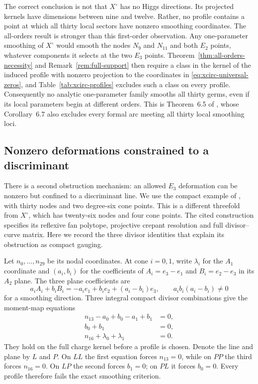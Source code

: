 The correct conclusion is not that $X^{\circ}$ has no Higgs directions. Its
projected kernels have dimensions between nine and twelve. Rather, no profile
contains a point at which all thirty local sectors have nonzero smoothing
coordinates. The all-orders result is stronger than this first-order
observation. Any one-parameter smoothing of $X^{\circ}$ would smooth the
nodes $N_9$ and $N_{11}$ and both $E_2$ points, whatever components it
selects at the two $E_3$ points. Theorem~\ref{thm:all-orders-necessity} and
Remark~\ref{rem:full-support} then require a class in the kernel of the
induced profile with nonzero projection to the coordinates in
\eqref{eq:xcirc-universal-zeros}, and Table~\ref{tab:xcirc-profiles}
excludes such a class on every profile. Consequently no analytic
one-parameter family smooths all thirty germs, even if its local parameters
begin at different orders. This is Theorem~6.5 of
\cite{Wuebben:2026obstruction}, whose Corollary~6.7 also excludes every
formal arc meeting all thirty local smoothing loci.

\subsection{Nonzero deformations constrained to a discriminant}
\label{subsec:discriminant-obstruction}

There is a second obstruction mechanism: an allowed $E_3$ deformation
can be nonzero but confined to a discriminant line. We use the compact
example of \cite[Theorems~5.1 and~5.3]{Wuebben:2026smoothing}, with thirty
nodes and two degree-six cone points. This is a different threefold from
$X^{\circ}$, which has twenty-six nodes and four cone points. The cited
construction specifies its reflexive fan polytope, projective crepant
resolution and full divisor--curve matrix. Here we record the three
divisor identities that explain its obstruction as compact gauging.

Let $n_0,\ldots,n_{29}$ be its nodal coordinates. At cone $i=0,1$,
write $\lambda_i$ for the $A_1$ coordinate and $(a_i,b_i)$ for the
coefficients of $A_i=e_3-e_1$ and $B_i=e_2-e_3$ in its $A_2$ plane.
The three plane coefficients are
\begin{equation}
 a_iA_i+b_iB_i=-a_i e_1+b_i e_2+(a_i-b_i)e_3,
 \qquad a_ib_i(a_i-b_i)\ne0
 \label{eq:discriminant-example-plane}
\end{equation}
for a smoothing direction. Three integral compact divisor combinations
give the moment-map equations
\begin{equation}
 \begin{aligned}
 n_{13}-a_0+b_0-a_1+b_1&=0,\\
 b_0+b_1&=0,\\
 n_{16}+\lambda_0+\lambda_1&=0.
 \end{aligned}
 \label{eq:discriminant-example-gaugings}
\end{equation}
They hold on the full charge kernel before a profile is chosen.
Denote the line and plane by $L$ and $P$. On $LL$ the first equation
forces $n_{13}=0$, while on $PP$ the third forces $n_{16}=0$.
On $LP$ the second forces $b_1=0$; on $PL$ it forces $b_0=0$.
Every profile therefore fails the exact smoothing criterion.

